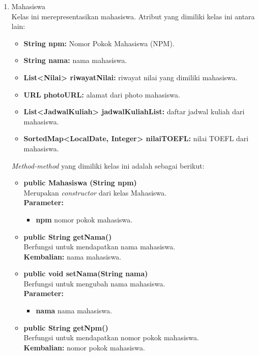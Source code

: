 \begin{enumerate}
\begin{enumerate}
		\item Mahasiswa\\
		Kelas ini merepresentasikan mahasiswa. Atribut yang dimiliki kelas ini antara lain:
		\begin{itemize}
			\item \textbf{String npm:} Nomor Pokok Mahasiswa (NPM).
			\item \textbf{String nama:} nama mahasiswa.
			\item \textbf{List<Nilai> riwayatNilai:} riwayat nilai 		yang dimiliki mahasiswa.
			\item \textbf{URL photoURL:} alamat dari photo mahasiswa.
			\item \textbf{List<JadwalKuliah> jadwalKuliahList:} daftar jadwal kuliah dari mahasiswa.
			\item \textbf{SortedMap<LocalDate, Integer> nilaiTOEFL:} nilai TOEFL dari mahasiswa.
		\end{itemize}
	\textit{Method-method} yang dimiliki kelas ini adalah sebagai berikut:
		\begin{itemize}
			\item \textbf{public Mahasiswa (String npm)}\\
			Merupakan \textit{constructor} dari kelas Mahasiswa.\\
			\textbf{Parameter:}
			\begin{itemize}
				\item \textbf{npm} nomor pokok mahasiswa.
			\end{itemize}
			\item \textbf{public String getNama()}\\
				Berfungsi untuk mendapatkan nama mahasiswa.\\
				\textbf{Kembalian:} nama mahasiswa.

			\item \textbf{public void setNama(String nama)}\\
				Berfungsi untuk mengubah nama mahasiswa.\\
				\textbf{Parameter:}
				\begin{itemize}
					\item \textbf{nama} nama mahasiswa.
				\end{itemize}
		
			\item \textbf{public String getNpm()}\\
				Berfungsi untuk mendapatkan nomor pokok mahasiswa.\\
				\textbf{Kembalian:} nomor pokok mahasiswa.
				

\end{itemize}
\end{enumerate}
\end{enumerate}
